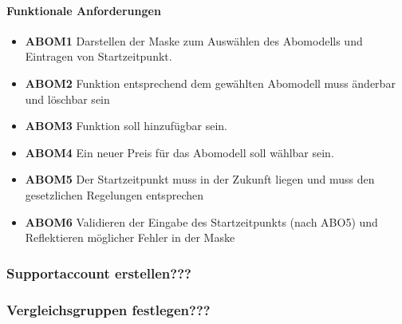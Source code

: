 \paragraph{Funktionale Anforderungen}
\begin{itemize}
	\item \textbf{ABOM1} Darstellen der Maske zum Auswählen des Abomodells und Eintragen von Startzeitpunkt.
	\item \textbf{ABOM2} Funktion entsprechend dem gewählten Abomodell muss änderbar und löschbar sein
	\item \textbf{ABOM3} Funktion soll hinzufügbar sein.
	\item \textbf{ABOM4} Ein neuer Preis für das Abomodell soll wählbar sein.
	\item \textbf{ABOM5} Der Startzeitpunkt muss in der Zukunft liegen und muss den gesetzlichen Regelungen entsprechen
	\item \textbf{ABOM6} Validieren der Eingabe des Startzeitpunkts (nach ABO5) und Reflektieren möglicher Fehler in der Maske
\end{itemize}


\subsubsection{Supportaccount erstellen???}

\subsubsection{Vergleichsgruppen festlegen???}
